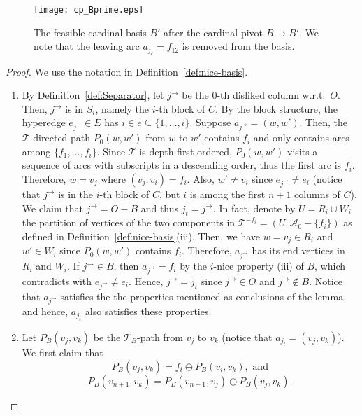 \documentclass[11pt]{article}
\begin{document}
\begin{figure}[h!]
    \centering
    \texttt{[image: cp\_Bprime.eps]}
    \caption{The feasible cardinal basis $B'$ after the cardinal pivot $B\to B'$. We note that the leaving arc $a_{j_\ell}=f_{12}$ is removed from the basis.}
    \label{fig:Pivoting-Ex-B'}
\end{figure}
\begin{proof}
We use the notation in Definition~\ref{def:nice-basis}.
\begin{enumerate}
    \item By Definition~\ref{def:Separator}, let $j^\rightarrow$ be the $0$-th disliked column w.r.t.~$O$. Then, $j^\rightarrow$ is in $S_i$, namely the $i$-th block of $C$. By the block structure, the hyperedge $e_{j^\rightarrow}\in E$ has $i\in e\subseteq\{1,\dots,i\}$. Suppose $a_{j^\rightarrow}=(w,w')$. Then, the $\mathcal{T}$-directed path $P_0(w,w')$ from $w$ to $w'$ contains $f_i$ and only contains arcs among $\{f_1,\dots,f_i\}$. Since $\mathcal{T}$ is depth-first ordered, $P_0(w,w')$ visits a sequence of arcs with subscripts in a descending order, thus the first arc is $f_i$. Therefore, $w=v_j$ where $(v_j,v_i)=f_i$. Also, $w'\neq v_i$ since $e_{j^\rightarrow}\neq e_i$ (notice that $j^\rightarrow$ is in the $i$-th block of $C$, but $i$ is among the first $n+1$ columns of $C$). We claim that $j^\rightarrow=O-B$ and thus $j_t=j^\rightarrow$. In fact, denote by $U=R_i\cup W_i$ the partition of vertices of the two components in $\mathcal{T}^{-f_i}=(U,\mathcal{A}_0-\{f_i\})$ as defined in Definition~\ref{def:nice-basis}(iii). Then, we have $w=v_j\in R_i$ and $w'\in W_i$ since $P_0(w,w')$ contains $f_i$. Therefore, $a_{j^\rightarrow}$ has its end vertices in $R_i$ and $W_i$. If $j^\rightarrow\in B$, then $a_{j^\rightarrow}=f_i$ by the $i$-nice property (iii) of $B$, which contradicts with $e_{j^\rightarrow}\neq e_i$. Hence, $j^\rightarrow=j_t$ since $j^\rightarrow\in O$ and $j^\rightarrow\notin B$. Notice that $a_{j^\rightarrow}$ satisfies the the properties mentioned as conclusions of the lemma, and hence, $a_{j_t}$ also satisfies these properties. 
\item Let $P_B(v_j,v_k)$ be the $\mathcal{T}_B$-path from $v_j$ to $v_k$ (notice that $a_{j_t}=(v_j,v_k)$). We first claim that
    \begin{equation}\label{eq:vj-vk}
        P_B(v_j,v_k)=f_i\oplus P_B(v_i,v_k),\textrm{ and}
    \end{equation}
    \begin{equation}\label{eq:r-vk}
        P_B(v_{n+1},v_k)=P_B(v_{n+1},v_j)\oplus P_B(v_j,v_k).

\end{equation}
\end{enumerate}
\end{proof}
\end{document}

